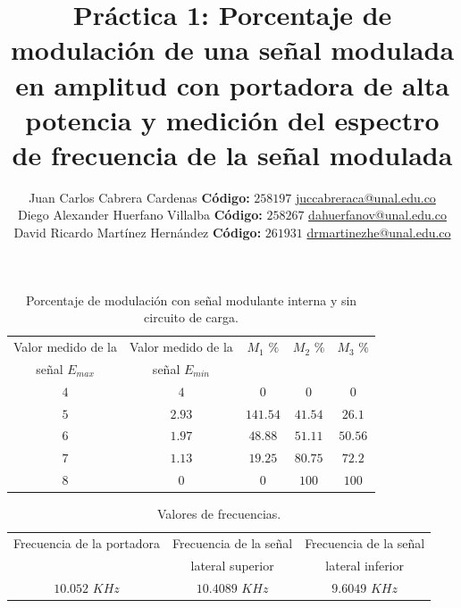 \documentclass[12pt,graphicx,caption,rotating]{article}
\begin{document}
\title{\textbf{Práctica 1:} Porcentaje de modulación de una señal modulada en amplitud con portadora de alta potencia y medición del espectro de frecuencia de la señal modulada}
\author{Juan Carlos Cabrera Cardenas \textbf{Código:} $258197$ \href{juccabreraca@unal.edu.co}{juccabreraca@unal.edu.co} \\
      Diego Alexander Huerfano Villalba \textbf{Código:} $258267$ \href{dahuerfanov@unal.edu.co}{dahuerfanov@unal.edu.co}\\
      David Ricardo Martínez Hernández \textbf{Código:} $261931$ \href{drmartinezhe@unal.edu.co}{drmartinezhe@unal.edu.co}}
\date{}
\maketitle

\begin{table}[H]
  \centering
  \caption{Porcentaje de modulación con señal modulante interna y sin circuito de carga.}
    \begin{tabular}{|c|c|c|c|c|} \hline
      Valor medido de la & Valor medido de la  & $M_{1}$ $\%$ & $M_2$ $\%$ & $M_3$ $\%$ \\
      señal $E_{max}$ & señal $E_{min}$ &  &  & \\ \hline
      $4$ & $4$ & $0$ & $0$ & $0$ \\ \hline
      $5$ & $2.93$ & $141.54$ & $41.54$ & $26.1$ \\ \hline
      $6$ & $1.97$ & $48.88$ & $51.11$ & $50.56$ \\ \hline
      $7$ & $1.13$ & $19.25$ & $80.75$ & $72.2$ \\ \hline
      $8$ & $0$ & $0$ & $100$ & $100$ \\ \hline
    \end{tabular}
  \label{tab1}
\end{table}

\begin{table}[H]
  \centering
  \caption{Valores de frecuencias.}
   \begin{tabular}{|c|c|c|}\hline
    Frecuencia de la portadora & Frecuencia de la señal& Frecuencia de la señal \\
    &  lateral superior & lateral inferior \\ \hline
    $10.052$ $KHz$ & $10.4089$ $KHz$ & $9.6049$ $KHz$ \\ \hline
    \end{tabular}
  \label{tab2}
\end{table}
\end{document}
